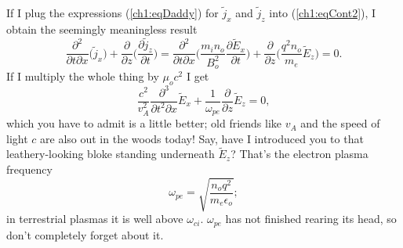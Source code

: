 If I plug the expressions (\ref{ch1:eqDaddy}) for $\tilde j_x$ and $\tilde j_z$ into
(\ref{ch1:eqCont2}), I obtain the seemingly meaningless result
\begin{equation*}
    \dfrac{\partial^2}{\partial t \partial x} \Big( \tilde j_x \Big) + \dfrac{\partial}{\partial z}
    \Big( \dfrac{\partial \tilde j_z}{\partial t} \Big) = \dfrac{\partial^2}{\partial
      t \partial x} \Big(\dfrac{m_i n_o }{B_o^2}\dfrac{\partial \tilde E_x}{\partial t} \Big) +
    \dfrac{\partial}{\partial z} \Big( \dfrac{q^2 n_o}{m_e} \tilde E_z \Big) = 0.
\end{equation*}
If I multiply the whole thing by $\mu_o c^2$ I get 
\begin{equation} \label{ch1:eqMeaningless}
  \dfrac{c^2}{v_A^2}\dfrac{\partial^3 }{\partial t^2 \partial x} \tilde E_x + \dfrac{1}{\omega_{pe}}\dfrac{\partial}{\partial z} \tilde E_z = 0,
\end{equation}
which you have to admit is a little better; old friends like $v_A$ and the speed
of light $c$ are also out in the woods today! Say, have I introduced you to that
leathery-looking bloke standing underneath $\tilde E_z$? That's the electron
plasma frequency
\begin{equation*}
\omega_{pe} = \sqrt{ \dfrac{n_o q^2}{m_e \epsilon_o}};
\end{equation*}
in terrestrial plasmas it is well above $\omega_{ci}$. $\omega_{pe}$ has not
finished rearing its head, so don't completely forget about it.

